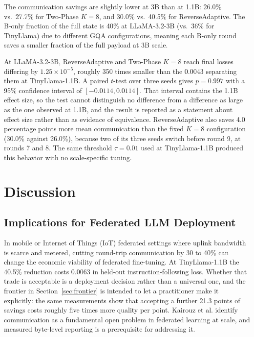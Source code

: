 \documentclass[iicol,pdflatex,sn-mathphys-num]{sn-jnl}
\begin{document}
The communication savings are slightly lower at 3B than at 1.1B: 26.0\% vs.\ 27.7\% for Two-Phase $K{=}8$, and 30.0\% vs.\ 40.5\% for ReverseAdaptive. The B-only fraction of the full state is 40\% at LLaMA-3.2-3B (vs.\ 36\% for TinyLlama) due to different GQA configurations, meaning each B-only round saves a smaller fraction of the full payload at 3B scale.

At LLaMA-3.2-3B, ReverseAdaptive and Two-Phase $K{=}8$ reach final losses differing by $1.25 \times 10^{-5}$, roughly 350 times smaller than the 0.0043 separating them at TinyLlama-1.1B. A paired $t$-test over three seeds gives $p = 0.997$ with a 95\% confidence interval of $[{-}0.0114, 0.0114]$. That interval contains the 1.1B effect size, so the test cannot distinguish no difference from a difference as large as the one observed at 1.1B, and the result is reported as a statement about effect size rather than as evidence of equivalence. ReverseAdaptive also saves 4.0 percentage points more mean communication than the fixed $K{=}8$ configuration (30.0\% against 26.0\%), because two of its three seeds switch before round 9, at rounds 7 and 8. The same threshold $\tau{=}0.01$ used at TinyLlama-1.1B produced this behavior with no scale-specific tuning.



\section{Discussion}
\label{sec:discussion}

\subsection{Implications for Federated LLM Deployment}
In mobile or Internet of Things (IoT) federated settings where uplink bandwidth is scarce and metered, cutting round-trip communication by 30 to 40\% can change the economic viability of federated fine-tuning. At TinyLlama-1.1B the 40.5\% reduction costs 0.0063 in held-out instruction-following loss. Whether that trade is acceptable is a deployment decision rather than a universal one, and the frontier in Section~\ref{sec:frontier} is intended to let a practitioner make it explicitly: the same measurements show that accepting a further 21.3 points of savings costs roughly five times more quality per point. Kairouz et al. \cite{kairouz2021advances} identify communication as a fundamental open problem in federated learning at scale, and measured byte-level reporting is a prerequisite for addressing it.
\end{document}
